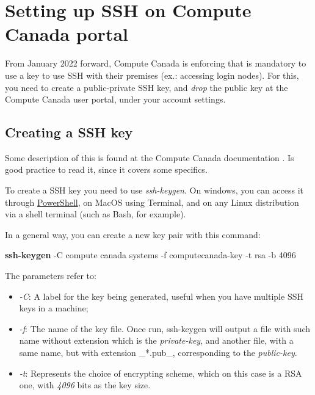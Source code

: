 \documentclass[
]{book}
\newenvironment{Shaded}{\begin{snugshade}}{\end{snugshade}}
\newcommand{\AttributeTok}[1]{\textcolor[rgb]{0.13,0.29,0.53}{#1}}
\newcommand{\FunctionTok}[1]{\textcolor[rgb]{0.13,0.29,0.53}{\textbf{#1}}}
\newcommand{\NormalTok}[1]{#1}
\newcommand{\StringTok}[1]{\textcolor[rgb]{0.31,0.60,0.02}{#1}}
\providecommand{\tightlist}{%
  \setlength{\itemsep}{0pt}\setlength{\parskip}{0pt}}
\begin{document}
\hypertarget{setting-up-ssh-on-compute-canada-portal}{%
\section{Setting up SSH on Compute Canada portal}\label{setting-up-ssh-on-compute-canada-portal}}

From January 2022 forward, Compute Canada is enforcing that is mandatory to use
a key to use SSH with their premises (ex.: accessing login nodes). For this, you
need to create a public-private SSH key, and \emph{drop} the public key at the
Compute Canada user portal, under your account settings.

\hypertarget{creating-a-ssh-key}{%
\subsection{Creating a SSH key}\label{creating-a-ssh-key}}

Some description of this is found at the Compute Canada documentation \citet{CC_ssh_key} .
Is good practice to read it, since it covers some specifics.

To create a SSH key you need to use \emph{ssh-keygen}. On windows, you can access it
through \href{https://docs.microsoft.com/en-us/windows-server/administration/openssh/openssh_keymanagement\#user-key-generation}{PowerShell}, on MacOS using Terminal, and on any Linux
distribution via a shell terminal (such as Bash, for example).

In a general way, you can create a new key pair with this command:

\begin{Shaded}
\begin{Highlighting}[]
\FunctionTok{ssh{-}keygen} \AttributeTok{{-}C} \StringTok{\textquotesingle{}compute canada systems\textquotesingle{}} \AttributeTok{{-}f}\NormalTok{ computecanada{-}key }\AttributeTok{{-}t}\NormalTok{ rsa }\AttributeTok{{-}b}\NormalTok{ 4096}
\end{Highlighting}
\end{Shaded}

The parameters refer to:

\begin{itemize}
\tightlist
\item
  \emph{-C}: A label for the key being generated, useful when you have multiple SSH
  keys in a machine;
\item
  \emph{-f}: The name of the key file. Once run, ssh-keygen will output a file with
  such name without extension which is the \emph{private-key}, and another file, with a
  same name, but with extension \_*.pub\_, corresponding to the \emph{public-key}.
\item
  \emph{-t}: Represents the choice of encrypting scheme, which on this case is a RSA
  one, with \emph{4096} bits as the key size.
\end{itemize}
\end{document}

